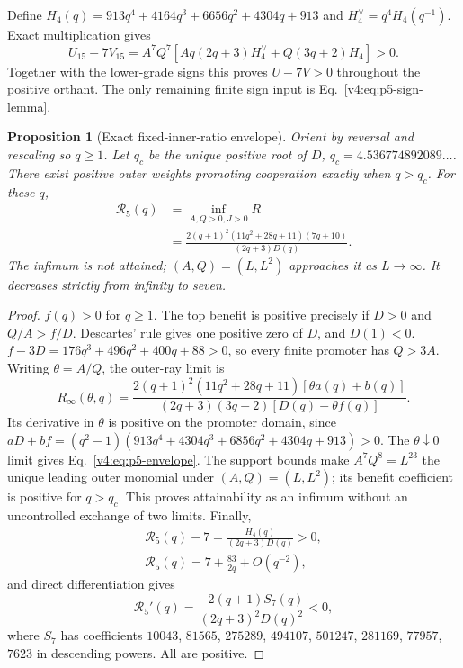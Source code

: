 \documentclass[aps,pre,reprint,amsmath,amssymb,longbibliography]{revtex4-2}
\newtheorem{proposition}[theorem]{Proposition}
\begin{document}
Define $H_4(q)=913q^4+4164q^3+6656q^2+4304q+913$ and
$H_4^\vee=q^4H_4(q^{-1})$. Exact multiplication gives
\begin{equation}
 U_{15}-7V_{15}=A^7Q^7[Aq(2q+3)H_4^\vee+Q(3q+2)H_4]>0.
\end{equation}
Together with the lower-grade signs this proves $U-7V>0$ throughout
the positive orthant. The only remaining finite sign input is
Eq.~\eqref{v4:eq:p5-sign-lemma}.

\begin{proposition}[Exact fixed-inner-ratio envelope]\label{v4:prop:p5-envelope}\label{app:v4-p5-envelope}
Orient by reversal and rescaling so $q\ge1$. Let $q_c$ be the unique
positive root of $D$, $q_c=4.536774892089\ldots$. There exist positive
outer weights promoting cooperation exactly when $q>q_c$. For these $q$,
\begin{equation}\label{v4:eq:p5-envelope}
 \begin{aligned}
 \mathcal R_5(q)&=\inf_{A,Q>0,J>0}R\\
 &=\frac{2(q+1)^2(11q^2+28q+11)(7q+10)}{(2q+3)D(q)}.
 \end{aligned}
\end{equation}
The infimum is not attained; $(A,Q)=(L,L^2)$ approaches it as $L\to\infty$.
It decreases strictly from infinity to seven.
\end{proposition}
\begin{proof}
$f(q)>0$ for $q\ge1$. The top benefit is positive precisely if
$D>0$ and $Q/A>f/D$. Descartes' rule gives one positive zero of $D$,
and $D(1)<0$. 
$f-3D=176q^3+496q^2+400q+88>0$, so every finite promoter has $Q>3A$.
Writing $\theta=A/Q$, the outer-ray limit is
\begin{equation}
 R_\infty(\theta,q)=
 \frac{2(q+1)^2(11q^2+28q+11)[\theta a(q)+b(q)]}
 {(2q+3)(3q+2)[D(q)-\theta f(q)]}.
\end{equation}
Its derivative in $\theta$ is positive on the promoter domain, since
$aD+bf=(q^2-1)(913q^4+4304q^3+6856q^2+4304q+913)>0$.
The $\theta\downarrow0$ limit gives Eq.~\eqref{v4:eq:p5-envelope}.
The support bounds make $A^7Q^8=L^{23}$ the unique leading outer monomial
under $(A,Q)=(L,L^2)$; its benefit coefficient is positive for $q>q_c$.
This proves attainability as an infimum without an uncontrolled exchange
of two limits. Finally,
\begin{equation}
 \begin{gathered}
 \mathcal R_5(q)-7=\frac{H_4(q)}{(2q+3)D(q)}>0,
 \\
 \mathcal R_5(q)=7+\frac{83}{2q}+O(q^{-2}),
 \end{gathered}
\end{equation}
and direct differentiation gives
\begin{equation}
 \mathcal R_5'(q)=\frac{-2(q+1)S_7(q)}{(2q+3)^2D(q)^2}<0,
\end{equation}
where $S_7$ has coefficients $10043$, $81565$, $275289$, $494107$,
$501247$, $281169$, $77957$, $7623$ in descending powers.
All are positive.
\end{proof}
\end{document}
